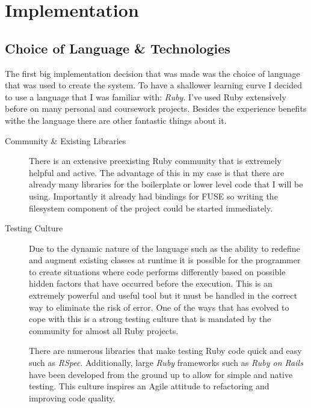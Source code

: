 \chapter{Implementation}

\section{Choice of Language \& Technologies}

The first big implementation decision that was made was the choice of language that was used to create the system. To have a shallower learning curve I decided to use a language that I was familiar with: \emph{Ruby}. I've used Ruby extensively before on many personal and coursework projects. Besides the experience benefits withe the language there are other fantastic things about it.

\begin{description}

\item[Community \& Existing Libraries] \hfill

There is an extensive preexisting Ruby community that is extremely helpful and active. The advantage of this in my case is that there are already many libraries for the boilerplate or lower level code that I will be using. Importantly it already had bindings for \ac{FUSE} so writing the filesystem component of the project could be started immediately.

\item[Testing Culture] \hfill

Due to the dynamic nature of the language such as the ability to redefine and augment existing classes at runtime it is possible for the programmer to create situations where code performs differently based on possible hidden factors that have occurred before the execution. This is an extremely powerful and useful tool but it must be handled in the correct way to eliminate the risk of error. One of the ways that has evolved to cope with this is a strong testing culture that is mandated by the community for almost all Ruby projects.

There are numerous libraries that make testing Ruby code quick and easy such as \emph{RSpec}. Additionally, large \emph{Ruby} frameworks such as \emph{Ruby on Rails} have been developed from the ground up to allow for simple and native testing. This culture inspires an Agile attitude to refactoring and improving code quality.

\end{description}

